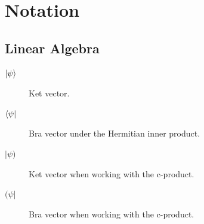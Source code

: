 \chapter*{Notation}

\section*{Linear Algebra}
\begin{description}
    \item[$\ket{\psi}$] Ket vector.
    \item[$\bra{\psi}$] Bra vector under the Hermitian inner product.
    \item[$|\psi)$] Ket vector when working with the c-product.
    \item[$(\psi|$] Bra vector when working with the c-product.
\end{description}